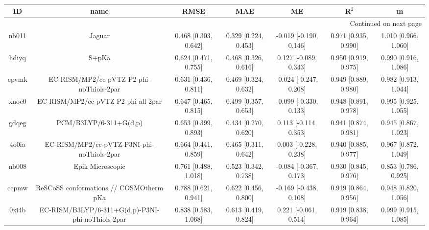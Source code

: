 \documentclass{article}
\begin{document}
\begin{center}
\begin{longtable}{|ccccccc|}
\toprule
    ID &                                               name &                  RMSE &                   MAE &                       ME &                 R$^2$ &                      m \\
\midrule
\endhead
\midrule
\multicolumn{7}{r}{{Continued on next page}} \\
\midrule
\endfoot

\bottomrule
\endlastfoot
 nb011 &                                             Jaguar &  0.468 [0.303, 0.642] &  0.329 [0.224, 0.453] &   -0.019 [-0.190, 0.146] &  0.971 [0.935, 0.990] &   1.010 [0.966, 1.060] \\
 hdiyq &                                              S+pKa &  0.624 [0.471, 0.755] &  0.468 [0.326, 0.616] &    0.127 [-0.089, 0.343] &  0.950 [0.919, 0.975] &   0.990 [0.916, 1.086] \\
 epvmk &           EC-RISM/MP2/cc-pVTZ-P2-phi-noThiols-2par &  0.631 [0.436, 0.811] &  0.469 [0.324, 0.632] &   -0.024 [-0.247, 0.208] &  0.949 [0.889, 0.980] &   0.982 [0.913, 1.044] \\
 xnoe0 &                EC-RISM/MP2/cc-pVTZ-P2-phi-all-2par &  0.647 [0.465, 0.815] &  0.499 [0.357, 0.653] &   -0.099 [-0.330, 0.133] &  0.948 [0.891, 0.978] &   0.995 [0.925, 1.055] \\
 gdqeg &                             PCM/B3LYP/6-311+G(d,p) &  0.653 [0.399, 0.893] &  0.434 [0.270, 0.620] &    0.113 [-0.114, 0.353] &  0.941 [0.874, 0.981] &   0.945 [0.867, 1.023] \\
 4o0ia &         EC-RISM/MP2/cc-pVTZ-P3NI-phi-noThiols-2par &  0.664 [0.441, 0.859] &  0.465 [0.311, 0.642] &    0.003 [-0.228, 0.238] &  0.940 [0.885, 0.977] &   0.967 [0.872, 1.049] \\
 nb008 &                                   Epik Microscopic &  0.761 [0.488, 1.018] &  0.523 [0.342, 0.738] &   -0.084 [-0.367, 0.173] &  0.930 [0.845, 0.976] &   0.853 [0.786, 0.925] \\
 ccpmw &            ReSCoSS conformations // COSMOtherm pKa &  0.788 [0.621, 0.941] &  0.622 [0.456, 0.800] &   -0.169 [-0.438, 0.108] &  0.919 [0.864, 0.956] &   0.948 [0.820, 1.056] \\
 0xi4b &  EC-RISM/B3LYP/6-311+G(d,p)-P3NI-phi-noThiols-2par &  0.838 [0.583, 1.068] &  0.613 [0.419, 0.824] &    0.221 [-0.061, 0.514] &  0.919 [0.838, 0.964] &   0.999 [0.915, 1.085] \\

\end{longtable}
\end{center}
\end{document}
